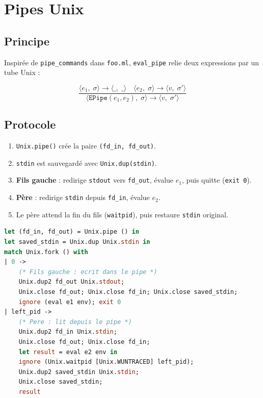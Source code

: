 \documentclass[11pt,a4paper]{article}
\newcommand{\sem}[4]{%
  \langle #1,\;#2\rangle \rightarrow \langle #3,\;#4\rangle}
\newcommand{\irule}[2]{%
  \dfrac{\displaystyle #1}{\displaystyle #2}
}
\newcommand{\V}[1]{\mathtt{#1}}
\begin{document}
\section{Pipes Unix}

\subsection{Principe}

Inspirée de \texttt{pipe\_commands} dans \texttt{foo.ml},
\texttt{eval\_pipe} relie deux expressions par un tube Unix :

\[
\irule{
\sem{e_1}{\sigma}{\_}{\_}
\quad
\sem{e_2}{\sigma}{v}{\sigma'}
}{
\sem{\V{EPipe}(e_1,e_2)}{\sigma}{v}{\sigma'}
}
\]

\subsection{Protocole}

\begin{enumerate}
  \item \texttt{Unix.pipe()} crée la paire \texttt{(fd\_in, fd\_out)}.
  \item \texttt{stdin} est sauvegardé avec \texttt{Unix.dup(stdin)}.
  \item \textbf{Fils gauche} : redirige \texttt{stdout} vers \texttt{fd\_out},
        évalue $e_1$, puis quitte (\texttt{exit 0}).
  \item \textbf{Père} : redirige \texttt{stdin} depuis \texttt{fd\_in},
        évalue $e_2$.
  \item Le père attend la fin du fils (\texttt{waitpid}),
        puis restaure \texttt{stdin} original.
\end{enumerate}

\begin{lstlisting}[language=ml]
let (fd_in, fd_out) = Unix.pipe () in
let saved_stdin = Unix.dup Unix.stdin in
match Unix.fork () with
| 0 ->
    (* Fils gauche : ecrit dans le pipe *)
    Unix.dup2 fd_out Unix.stdout;
    Unix.close fd_out; Unix.close fd_in; Unix.close saved_stdin;
    ignore (eval e1 env); exit 0
| left_pid ->
    (* Pere : lit depuis le pipe *)
    Unix.dup2 fd_in Unix.stdin;
    Unix.close fd_out; Unix.close fd_in;
    let result = eval e2 env in
    ignore (Unix.waitpid [Unix.WUNTRACED] left_pid);
    Unix.dup2 saved_stdin Unix.stdin;
    Unix.close saved_stdin;
    result
\end{lstlisting}
\end{document}
